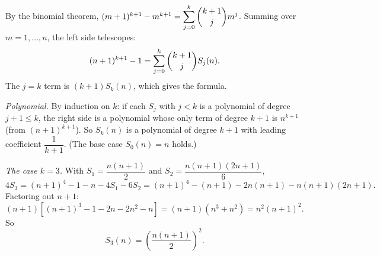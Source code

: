 By the binomial theorem, $(m+1)^{k+1}-m^{k+1}=\displaystyle\sum_{j=0}^{k}\dbinom{k+1}{j}m^j$. Summing over $m=1,\dots,n$, the left side telescopes:
\[(n+1)^{k+1}-1=\sum_{j=0}^{k}\dbinom{k+1}{j}S_j(n).\]
The $j=k$ term is $(k+1)S_k(n)$, which gives the formula.

\emph{Polynomial.} By induction on $k$: if each $S_j$ with $j<k$ is a polynomial of degree $j+1\le k$, the right side is a polynomial whose only term of degree $k+1$ is $n^{k+1}$ (from $(n+1)^{k+1}$). So $S_k(n)$ is a polynomial of degree $k+1$ with leading coefficient $\dfrac1{k+1}$. (The base case $S_0(n)=n$ holds.)

\emph{The case $k=3$.} With $S_1=\dfrac{n(n+1)}2$ and $S_2=\dfrac{n(n+1)(2n+1)}6$,
\[4S_3=(n+1)^4-1-n-4S_1-6S_2=(n+1)^4-(n+1)-2n(n+1)-n(n+1)(2n+1).\]
Factoring out $n+1$: $(n+1)\left[(n+1)^3-1-2n-2n^2-n\right]=(n+1)\left(n^3+n^2\right)=n^2(n+1)^2$. So
\[S_3(n)=\boxed{\left(\dfrac{n(n+1)}{2}\right)^2}.\]
